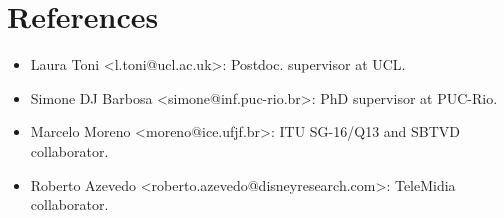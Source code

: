\documentclass[10pt,a4paper,sans,colorlinks]{moderncv}
\begin{document}
\section{References}
  \begin{itemize}[nosep]
    \item Laura Toni <l.toni@ucl.ac.uk>: Postdoc. supervisor at UCL.
    \item Simone DJ Barbosa <simone@inf.puc-rio.br>: PhD supervisor at PUC-Rio.
    \item Marcelo Moreno <moreno@ice.ufjf.br>: ITU SG-16/Q13 and SBTVD collaborator.
    \item Roberto Azevedo <roberto.azevedo@disneyresearch.com>: TeleMidia collaborator.
  \end{itemize}
\end{document}
